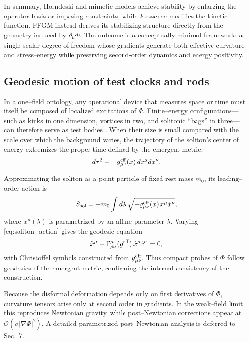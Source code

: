 \documentclass{article}
\begin{document}
In summary, Horndeski and mimetic models achieve stability by enlarging the operator basis or imposing constraints, while $k$-essence modifies the kinetic function. PFGM instead derives its stabilizing structure directly from the geometry induced by $\partial_\mu\Phi$. The outcome is a conceptually minimal framework: a single scalar degree of freedom whose gradients generate both effective curvature and stress–energy while preserving second-order dynamics and energy positivity.

\subsection{Geodesic motion of test clocks and rods}

In a one–field ontology, any operational device that measures space or time must itself be composed of localized excitations of $\Phi$. Finite–energy configurations—such as kinks in one dimension, vortices in two, and solitonic ``bags'' in three—can therefore serve as test bodies \cite{MantonSutcliffe2004}. When their size is small compared with the scale over which the background varies, the trajectory of the soliton’s center of energy extremizes the proper time defined by the emergent metric:
\begin{equation}
d\tau^2 = - g^{\rm eff}_{\mu\nu}(x)\,dx^\mu dx^\nu .
\label{eq:proper_time}
\end{equation}

Approximating the soliton as a point particle of fixed rest mass $m_0$, its leading–order action is
\begin{equation}
S_{\rm sol} = - m_0 \int d\lambda \,
\sqrt{- g^{\rm eff}_{\mu\nu}(x)\,\dot{x}^\mu \dot{x}^\nu} ,
\label{eq:soliton_action}
\end{equation}
where $x^\mu(\lambda)$ is parametrized by an affine parameter $\lambda$. Varying \eqref{eq:soliton_action} gives the geodesic equation
\begin{equation}
\ddot{x}^\mu + \Gamma^\mu_{\rho\sigma}(g^{\rm eff}) \, \dot{x}^\rho \dot{x}^\sigma = 0 ,
\label{eq:geodesic_equation}
\end{equation}
with Christoffel symbols constructed from $g^{\rm eff}_{\mu\nu}$. Thus compact probes of $\Phi$ follow geodesics of the emergent metric, confirming the internal consistency of the construction.

Because the disformal deformation depends only on first derivatives of $\Phi$, curvature tensors arise only at second order in gradients. In the weak–field limit this reproduces Newtonian gravity, while post–Newtonian corrections appear at $\mathcal{O}(\alpha |\nabla \Phi|^2)$. A detailed parametrized post–Newtonian analysis is deferred to Sec.~7.
\end{document}
